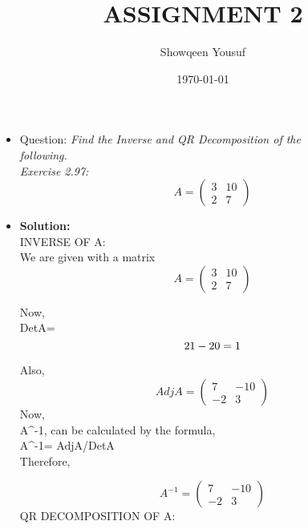\documentclass{article}
\begin{document}
\title{ASSIGNMENT 2 }
\author{Showqeen Yousuf}
\date{\today}
\maketitle

\begin{itemize}
\item{{Question:{\textit{ Find the Inverse and QR Decomposition of the\\ following.}}}}\\

\newpage
{\textit{Exercise 2.97:}}
\[
A=
\begin{pmatrix}
3 & 10\\
2 & 7
\end{pmatrix}
\]

\item{\textbf{Solution:}}\\

INVERSE OF A:\\

We are given with a matrix 
\[
A=
\begin{pmatrix}
3 & 10\\
2 & 7
\end{pmatrix}
\]

Now,\\

DetA=
 $$
 21 - 20=1\\
 $$
 
Also,\\

\[
AdjA=
\begin{pmatrix}
7 & -10\\
-2 & 3
\end{pmatrix}
\]
Now,\\

A^{-1}, can \hspace{0.3 cm}be \hspace{0.3 cm}calculated \hspace{0.3 cm}by \hspace{0.3 cm}the \hspace{0.3 cm}formula,\\

A^{-1}= AdjA/DetA\\

Therefore, 

\[
A^{-1}=
\begin{pmatrix}
7 & -10\\
-2 & 3
\end{pmatrix}
\]
\newpage
QR DECOMPOSITION OF A:\\


\end{itemize}
\end{document}
